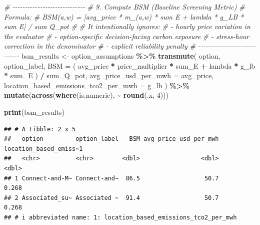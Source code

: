\documentclass[
]{article}
\newenvironment{Shaded}{\begin{snugshade}}{\end{snugshade}}
\newcommand{\AttributeTok}[1]{\textcolor[rgb]{0.13,0.29,0.53}{#1}}
\newcommand{\CommentTok}[1]{\textcolor[rgb]{0.56,0.35,0.01}{\textit{#1}}}
\newcommand{\DecValTok}[1]{\textcolor[rgb]{0.00,0.00,0.81}{#1}}
\newcommand{\FunctionTok}[1]{\textcolor[rgb]{0.13,0.29,0.53}{\textbf{#1}}}
\newcommand{\NormalTok}[1]{#1}
\newcommand{\OtherTok}[1]{\textcolor[rgb]{0.56,0.35,0.01}{#1}}
\newcommand{\SpecialCharTok}[1]{\textcolor[rgb]{0.81,0.36,0.00}{\textbf{#1}}}
\begin{document}
\begin{Shaded}
\begin{Highlighting}[]
\CommentTok{\# {-}{-}{-}{-}{-}{-}{-}{-}{-}{-}{-}{-}{-}{-}{-}{-}{-}{-}{-}{-}{-}{-}{-}{-}{-}{-}{-}{-}{-}}
\CommentTok{\# 9. Compute BSM (Baseline Screening Metric)}
\CommentTok{\# Formula:}
\CommentTok{\# BSM(a,w) = [avg\_price * m\_(a,w) * sum E + lambda * g\_LB * sum E] / sum Q\_pot}
\CommentTok{\#}
\CommentTok{\# It intentionally ignores:}
\CommentTok{\# {-} hourly price variation in the evaluator}
\CommentTok{\# {-} option{-}specific decision{-}facing carbon exposure}
\CommentTok{\# {-} stress{-}hour correction in the denominator}
\CommentTok{\# {-} explicit reliability penalty}
\CommentTok{\# {-}{-}{-}{-}{-}{-}{-}{-}{-}{-}{-}{-}{-}{-}{-}{-}{-}{-}{-}{-}{-}{-}{-}{-}{-}{-}{-}{-}{-}}
\NormalTok{bsm\_results }\OtherTok{\textless{}{-}}\NormalTok{ option\_assumptions }\SpecialCharTok{\%\textgreater{}\%}
  \FunctionTok{transmute}\NormalTok{(}
\NormalTok{    option,}
\NormalTok{    option\_label,}
    \AttributeTok{BSM =}
\NormalTok{      (}
\NormalTok{        avg\_price }\SpecialCharTok{*}\NormalTok{ price\_multiplier }\SpecialCharTok{*}\NormalTok{ sum\_E }\SpecialCharTok{+}
\NormalTok{          lambda }\SpecialCharTok{*}\NormalTok{ g\_lb }\SpecialCharTok{*}\NormalTok{ sum\_E}
\NormalTok{      ) }\SpecialCharTok{/}\NormalTok{ sum\_Q\_pot,}
    \AttributeTok{avg\_price\_usd\_per\_mwh =}\NormalTok{ avg\_price,}
    \AttributeTok{location\_based\_emissions\_tco2\_per\_mwh =}\NormalTok{ g\_lb}
\NormalTok{  ) }\SpecialCharTok{\%\textgreater{}\%}
  \FunctionTok{mutate}\NormalTok{(}\FunctionTok{across}\NormalTok{(}\FunctionTok{where}\NormalTok{(is.numeric), }\SpecialCharTok{\textasciitilde{}} \FunctionTok{round}\NormalTok{(.x, }\DecValTok{4}\NormalTok{)))}

\FunctionTok{print}\NormalTok{(bsm\_results)}
\end{Highlighting}
\end{Shaded}

\begin{verbatim}
## # A tibble: 2 x 5
##   option         option_label   BSM avg_price_usd_per_mwh location_based_emiss~1
##   <chr>          <chr>        <dbl>                 <dbl>                  <dbl>
## 1 Connect-and-M~ Connect-and~  86.5                  50.7                  0.268
## 2 Associated_su~ Associated ~  91.4                  50.7                  0.268
## # i abbreviated name: 1: location_based_emissions_tco2_per_mwh
\end{verbatim}
\end{document}
